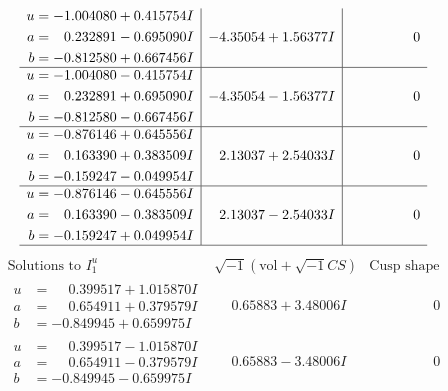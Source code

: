 \documentclass[1p]{elsarticle_modified}
\theoremstyle{definition}
\newcommand{\I}{\sqrt{-1}}
\begin{document}
$$\begin{array}{c|c|c}
\begin{aligned}
u &= -1.004080 + 0.415754 I \\
a &= \phantom{-}0.232891 - 0.695090 I \\
b &= -0.812580 + 0.667456 I\end{aligned}
 & -4.35054 + 1.56377 I & \phantom{-0.000000 } 0 \\ \hline\begin{aligned}
u &= -1.004080 - 0.415754 I \\
a &= \phantom{-}0.232891 + 0.695090 I \\
b &= -0.812580 - 0.667456 I\end{aligned}
 & -4.35054 - 1.56377 I & \phantom{-0.000000 } 0 \\ \hline\begin{aligned}
u &= -0.876146 + 0.645556 I \\
a &= \phantom{-}0.163390 + 0.383509 I \\
b &= -0.159247 - 0.049954 I\end{aligned}
 & \phantom{-}2.13037 + 2.54033 I & \phantom{-0.000000 } 0 \\ \hline\begin{aligned}
u &= -0.876146 - 0.645556 I \\
a &= \phantom{-}0.163390 - 0.383509 I \\
b &= -0.159247 + 0.049954 I\end{aligned}
 & \phantom{-}2.13037 - 2.54033 I & \phantom{-0.000000 } 0\\
 \hline 
 \end{array}$$\newpage$$\begin{array}{c|c|c}  
\text{Solutions to }I^u_{1}& \I (\text{vol} + \sqrt{-1}CS) & \text{Cusp shape}\\
 \hline 
\begin{aligned}
u &= \phantom{-}0.399517 + 1.015870 I \\
a &= \phantom{-}0.654911 + 0.379579 I \\
b &= -0.849945 + 0.659975 I\end{aligned}
 & \phantom{-}0.65883 + 3.48006 I & \phantom{-0.000000 } 0 \\ \hline\begin{aligned}
u &= \phantom{-}0.399517 - 1.015870 I \\
a &= \phantom{-}0.654911 - 0.379579 I \\
b &= -0.849945 - 0.659975 I\end{aligned}
 & \phantom{-}0.65883 - 3.48006 I & \phantom{-0.000000 } 0 \\ \hline\begin{aligned}

\end{aligned}
\end{array}$$
\end{document}
